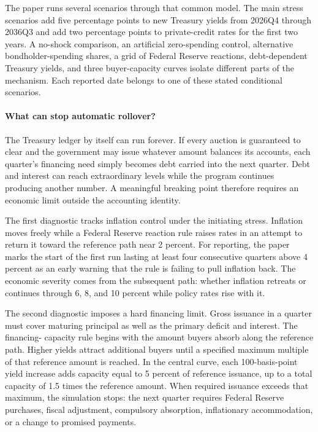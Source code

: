 \documentclass[11pt]{article}
\begin{document}
The paper runs several scenarios through that common model.  The main stress scenarios add
five percentage points to new Treasury yields from 2026Q4 through 2036Q3 and add two
percentage points to private-credit rates for the first two years.  A no-shock comparison, an
artificial zero-spending control, alternative bondholder-spending shares, a grid of Federal
Reserve reactions, debt-dependent Treasury yields, and three buyer-capacity curves isolate
different parts of the mechanism.  Each reported date belongs to one of these stated
conditional scenarios.

\paragraph{What can stop automatic rollover?}
The Treasury ledger by itself can run forever.  If every auction is guaranteed to clear and
the government may issue whatever amount balances its accounts, each quarter's financing need
simply becomes debt carried into the next quarter.  Debt and interest can reach extraordinary
levels while the program continues producing another number.  A meaningful breaking point
therefore requires an economic limit outside the accounting identity.

The first diagnostic tracks inflation control under the initiating stress.  Inflation moves
freely while a Federal Reserve reaction rule raises rates in an attempt to return it toward
the reference path near 2 percent.  For reporting, the paper marks the start of the first run
lasting at least four consecutive quarters above 4 percent as an early warning that the rule
is failing to pull inflation back.
The economic severity comes from the subsequent path: whether inflation retreats or continues
through 6, 8, and 10 percent while policy rates rise with it.

The second diagnostic imposes a hard financing limit.  Gross issuance in a quarter
must cover maturing principal as well as the primary deficit and interest.  The financing-
capacity rule begins with the amount buyers absorb along the reference path.  Higher yields
attract additional buyers until a specified maximum multiple of that reference amount is
reached.  In the central curve, each 100-basis-point yield increase adds capacity equal to 5
percent of reference issuance, up to a total capacity of 1.5 times the reference amount.  When
required issuance exceeds that maximum, the simulation stops: the next quarter requires
Federal Reserve purchases, fiscal adjustment, compulsory absorption, inflationary
accommodation, or a change to promised payments.
\end{document}
